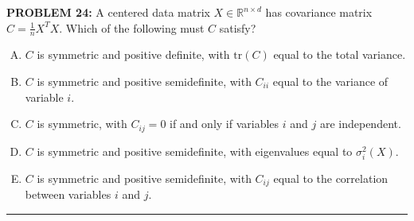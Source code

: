 \documentclass[12pt]{amsart}
\newcommand{\divider}{
  \vspace{-1em} %
  \noindent
  \raisebox{-0.15ex}{\textbullet}%
  \hspace{0.5em}%
  \rule[0.5ex]{0.95\textwidth}{1.0pt}%
  \hspace{0.5em}%
  \raisebox{-0.15ex}{\textbullet}%
  \vspace{0em} %
}
\begin{document}
{\bf PROBLEM 24:}
%
A centered data matrix $X \in \mathbb{R}^{n \times d}$ has covariance matrix $C = \frac{1}{n}X^TX$.
%
Which of the following must $C$ satisfy?

\begin{enumerate}[(A)]
\item $C$ is symmetric and positive definite, with $\mathrm{tr}(C)$ equal to the total variance.
\item $C$ is symmetric and positive semidefinite, with $C_{ii}$ equal to the variance of variable $i$.
\item $C$ is symmetric, with $C_{ij} = 0$ if and only if variables $i$ and $j$ are independent.
\item $C$ is symmetric and positive semidefinite, with eigenvalues equal to $\sigma_i^2(X)$.
\item $C$ is symmetric and positive semidefinite, with $C_{ij}$ equal to the correlation between variables $i$ and $j$.
\end{enumerate}

%

\divider
\end{document}
